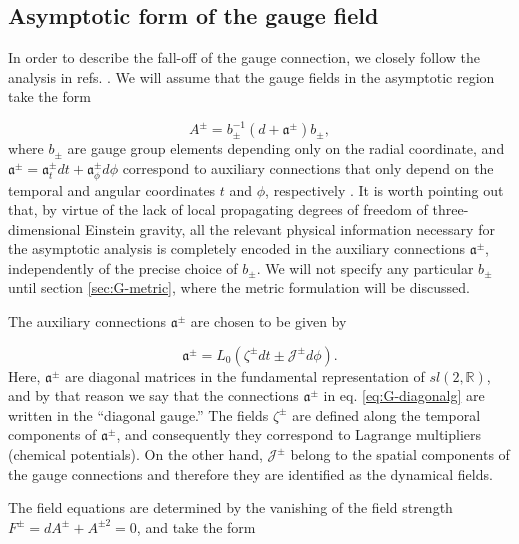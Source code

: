 \documentclass[letterpaper,11pt,oneside]{book}
\begin{document}
\newpage

\subsection{Asymptotic form of the gauge field\label{subsec:Asymptotic-form-of1}}

In order to describe the fall-off of the gauge connection, we closely
follow the analysis in refs. \cite{Afshar:2016wfy,Afshar:2016kjj}.
We will assume that the
gauge fields in the asymptotic region take the form

\begin{equation}
	A^{\pm}=b_{\pm}^{-1}\left(d+\mathfrak{a}^{\pm}\right)b_{\pm},\label{eq:G-gaugetransform}
\end{equation}
where $b_{\pm}$ are gauge group elements depending only on the radial
coordinate, and $\mathfrak{a}^{\pm}=\mathfrak{a}_{t}^{\pm}dt+\mathfrak{a}_{\phi}^{\pm}d\phi$
correspond to auxiliary connections that only depend on the temporal
and angular coordinates $t$ and $\phi$, respectively \cite{Coussaert:1995zp}.
It is worth pointing out that, by virtue of the lack of local propagating
degrees of freedom of three-dimensional Einstein gravity, all the
relevant physical information necessary for the asymptotic analysis
is completely encoded in the auxiliary connections $\mathfrak{a}^{\pm}$,
independently of the precise choice of $b_{\pm}$. We will not specify
any particular $b_{\pm}$ until section \ref{sec:G-metric}, where
the metric formulation will be discussed.

The auxiliary connections $\mathfrak{a}^{\pm}$ are chosen to be given
by

\begin{equation}
	\mathfrak{a}^{\pm}=L_{0}\left(\zeta^{\pm}dt\pm\mathcal{J}^{\pm}d\phi\right).\label{eq:G-diagonalg}
\end{equation}
Here, $\mathfrak{a}^{\pm}$ are diagonal matrices in the fundamental
representation of $sl(2,\mathbb{R})$, and by that reason we say that
the connections $\mathfrak{a}^{\pm}$ in eq. \eqref{eq:G-diagonalg}
are written in the ``diagonal gauge.'' The fields $\zeta^{\pm}$
are defined along the temporal components of $\mathfrak{a}^{\pm}$,
and consequently they correspond to Lagrange multipliers (chemical
potentials). On the other hand, $\mathcal{J}^{\pm}$ belong to the
spatial components of the gauge connections and therefore they are
identified as the dynamical fields.

The field equations are determined by the vanishing of the field strength
$F^{\pm}=dA^{\pm}+A^{\pm2}=0$, and take the form
\end{document}
